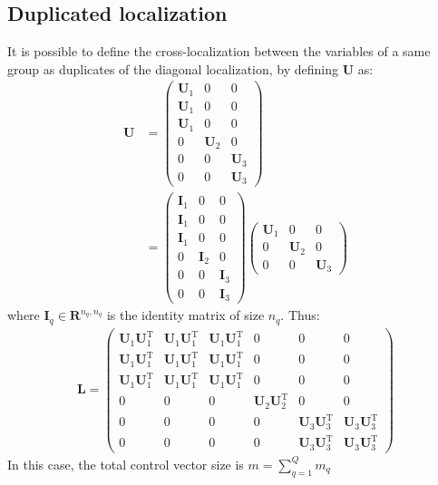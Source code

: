 \documentclass[12pt]{scrartcl}
\begin{document}
\subsection{Duplicated localization}
It is possible to define the cross-localization between the variables of a same group as duplicates of the diagonal localization, by defining $\mathbf{U}$ as: 
\begin{align}
\mathbf{U} & = \left( \begin{array}{c|c|c}
\mathbf{U}_1 & 0 & 0 \\
\mathbf{U}_1 & 0 & 0 \\
\mathbf{U}_1 & 0 & 0 \\[0.3ex]
\hline
0 & \mathbf{U}_2 & 0 \\[0.3ex]
\hline
0 & 0 & \mathbf{U}_3 \\
0 & 0 & \mathbf{U}_3
\end{array} \right) \nonumber \\
& = \left( \begin{array}{c|c|c}
\mathbf{I}_1 & 0 & 0 \\
\mathbf{I}_1 & 0 & 0 \\
\mathbf{I}_1 & 0 & 0 \\[0.3ex]
\hline
0 & \mathbf{I}_2 & 0 \\[0.3ex]
\hline
0 & 0 & \mathbf{I}_3 \\
0 & 0 & \mathbf{I}_3
\end{array} \right)
\left( \begin{array}{c|c|c}
\mathbf{U}_1 & 0 & 0 \\[0.3ex]
\hline
0 & \mathbf{U}_2 & 0 \\[0.3ex]
\hline
0 & 0 & \mathbf{U}_3
\end{array} \right)
\end{align}
where $\mathbf{I}_q \in \mathbf{R}^{n_q,n_q}$ is the identity matrix of size $n_q$. Thus:
\begin{align}
\mathbf{L} = \left( \begin{array}{ccc|c|cc}
\mathbf{U}_1 \mathbf{U}_1^\mathrm{T} & \mathbf{U}_1 \mathbf{U}_1^\mathrm{T} & \mathbf{U}_1 \mathbf{U}_1^\mathrm{T} & 0 & 0 & 0 \\
\mathbf{U}_1 \mathbf{U}_1^\mathrm{T} & \mathbf{U}_1 \mathbf{U}_1^\mathrm{T} & \mathbf{U}_1 \mathbf{U}_1^\mathrm{T} & 0 & 0 & 0 \\
\mathbf{U}_1 \mathbf{U}_1^\mathrm{T} & \mathbf{U}_1 \mathbf{U}_1^\mathrm{T} & \mathbf{U}_1 \mathbf{U}_1^\mathrm{T} & 0 & 0 & 0 \\[0.3ex]
\hline
0 & 0 & 0 & \mathbf{U}_2 \mathbf{U}_2^\mathrm{T} & 0 & 0 \\[0.3ex]
\hline
0 & 0 & 0 & 0 & \mathbf{U}_3 \mathbf{U}_3^\mathrm{T} & \mathbf{U}_3 \mathbf{U}_3^\mathrm{T} \\
0 & 0 & 0 & 0 & \mathbf{U}_3 \mathbf{U}_3^\mathrm{T} & \mathbf{U}_3 \mathbf{U}_3^\mathrm{T}
\end{array} \right)
\end{align}
In this case, the total control vector size is $\displaystyle m = \sum_{q=1}^Q m_q$
\end{document}
